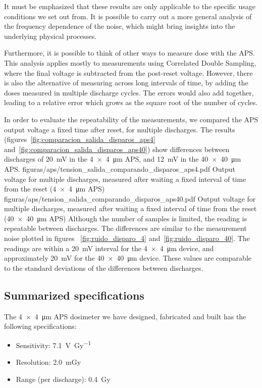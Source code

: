 It must be emphasized that these results are only applicable to the specific usage conditions we set out from.
It is possible to carry out a more general analysis of the frequency dependence of the noise,
which might bring insights into the underlying physical processes.

Furthermore, it is possible to think of other ways to measure dose with the APS.
This analysis applies mostly to measurements using Correlated Double Sampling,
where the final voltage is subtracted from the post-reset voltage.
However, there is also the alternative of measuring across long intervals of time,
by adding the doses measured in multiple discharge cycles.
The errors would also add together,
leading to a relative error which grows as the square root of the number of cycles.

In order to evaluate the repeatability of the measurements,
we compared the APS output voltage a fixed time after reset,
for multiple discharges.
The results (figures~\ref{fig:comparacion_salida_disparos_aps4} and~\ref{fig:comparacion_salida_disparos_aps40})
show differences between discharges of
\SI{20}{\milli\volt} in the \SI{4x4}{\micro\meter} APS,
and \SI{12}{\milli\volt} in the \SI{40x40}{\micro\meter} APS.
{figuras/aps/tension_salida_comparando_disparos_aps4.pdf}
{Output voltage for multiple discharges, 
measured after waiting a fixed interval of time from the reset
(\SI{4x4}{\micro\meter} APS)}
{figuras/aps/tension_salida_comparando_disparos_aps40.pdf}
{Output voltage for multiple discharges, 
measured after waiting a fixed interval of time from the reset
(\SI{40x40}{\micro\meter} APS)}
Although the number of samples is limited,
the reading is repeatable between discharges.
The differences are similar to the measurement noise plotted in figures~
\ref{fig:ruido_disparo_4} and~\ref{fig:ruido_disparo_40}.
The readings are within a \SI{20}{\milli\volt} interval for the \SI{4x4}{\micro\meter} device,
and approximately \SI{20}{\milli\volt} for the \SI{40x40}{\micro\meter} device.
These values are comparable to the standard deviations of the differences between discharges.
%
\subsection{Summarized specifications}
The \SI{4x4}{\micro\meter} APS dosimeter we have designed, fabricated and built
has the following specifications:
\begin{itemize}
    \item Sensitivity: \SI{7.1}{\volt\per\gray}
    \item Resolution: \SI{2.0}{\milli\gray}
    \item Range (per discharge): \SI{0.4}{\gray}
\end{itemize}
%
